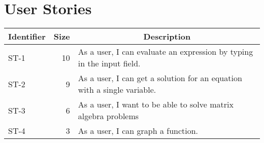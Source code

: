 \documentclass[11pt]{article}
\begin{document}
\newpage

\section{User Stories}

\begin{tabular}{|l|r|l|}
\hline
\multicolumn{1}{|c|}{\textbf{Identifier}} & \multicolumn{1}{c|}{\textbf{Size}} & \multicolumn{1}{c|}{\textbf{Description}} \\ \hline
ST-1 & 10 & As a user, I can evaluate an expression by typing in the input field. \\ \hline
ST-2 & 9  & As a user, I can get a solution for an equation with a single variable. \\ \hline
ST-3 & 6  & As a user, I want to be able to solve matrix algebra problems \\ \hline
ST-4 & 3  & As a user, I can graph a function. \\ \hline
\end{tabular}
\end{document}
